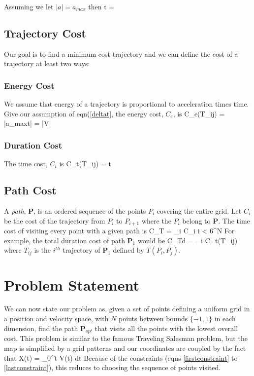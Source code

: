 \documentclass[letterpaper]{article}
\begin{document}
Assuming we let $|a| = a_{max}$ then
\beq \label{deltat}
\Delta t = 
\eeq

\subsection{Trajectory Cost}
Our goal is to find a minimum cost trajectory and we can define the cost of a trajectory at least two ways:

\subsubsection{Energy Cost}    We assume that energy of a trajectory is proportional to acceleration times time.  Give our assumption
of eqn(\ref{deltat}, the energy cost, $C_e$, is
\beq
C_{e}(T_{ij}) = |a_{max}\Delta t| = |\Delta V|
\eeq

\subsubsection{Duration Cost}   The time cost, $C_t$ is
\beq
C_t(T_{ij}) = \Delta t
\eeq

\subsection{Path Cost}
A {\it path}, $\mathbf{P}$, is an ordered sequence of the points $P_i$ covering the entire grid.
Let $C_i$ be the cost of the trajectory from $P_i$ to $P_{i+1}$ where the $P_i$ belong to $\mathbf{P}$.
The time   cost of visiting every point with a given path is
\beq
C_T = \Sigma_i C_i   \leq i < 6^N
\eeq
For example, the total duration cost of path $\mathbf{P}_1$ would be
\beq
C_{Td} = \Sigma_i C_t(T_{ij})
\eeq
where $T_{ij}$ is the $i^{th}$ trajectory of $\mathbf{P}_1$ defined by $T(P_i, P_j)$.

\section{Problem Statement}

We can now state our problem as, given a set of points defining a uniform grid in a position and velocity
space, with $N$ points between bounds $\{-1,1\}$ in each dimension, find the path $\mathbf{P}_{opt}$
that visits all the points with the lowest overall cost.   This problem is similar to the famous
Traveling Salesman problem, but the map is simplified by a grid patterns and our coordinates are coupled by
the fact that
\beq
X(t) = \int_0^t V(t) dt
\eeq
Because of the constraints (eqns \ref{firstconstraint} to \ref{lastconstraint}), this reduces to
choosing the sequence of points visited.
\end{document}
